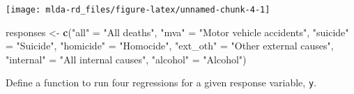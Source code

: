 \documentclass[]{book}
\newenvironment{Shaded}{\begin{snugshade}}{\end{snugshade}}
\newcommand{\KeywordTok}[1]{\textcolor[rgb]{0.13,0.29,0.53}{\textbf{#1}}}
\newcommand{\StringTok}[1]{\textcolor[rgb]{0.31,0.60,0.02}{#1}}
\newcommand{\NormalTok}[1]{#1}
\theoremstyle{definition}
\theoremstyle{definition}
\theoremstyle{definition}
\theoremstyle{remark}
\begin{document}
\begin{center}\texttt{[image: mlda-rd\_files/figure-latex/unnamed-chunk-4-1]} \end{center}

\begin{Shaded}
\begin{Highlighting}[]
\NormalTok{responses <-}\StringTok{ }\KeywordTok{c}\NormalTok{(}\StringTok{"all"}\NormalTok{ =}\StringTok{ "All deaths"}\NormalTok{,}
               \StringTok{"mva"}\NormalTok{ =}\StringTok{ "Motor vehicle accidents"}\NormalTok{,}
               \StringTok{"suicide"}\NormalTok{ =}\StringTok{ "Suicide"}\NormalTok{,}
               \StringTok{"homicide"}\NormalTok{ =}\StringTok{ "Homocide"}\NormalTok{,}
               \StringTok{"ext_oth"}\NormalTok{ =}\StringTok{ "Other external causes"}\NormalTok{,}
               \StringTok{"internal"}\NormalTok{ =}\StringTok{ "All internal causes"}\NormalTok{,}
               \StringTok{"alcohol"}\NormalTok{ =}\StringTok{ "Alcohol"}\NormalTok{)}
\end{Highlighting}
\end{Shaded}

Define a function to run four regressions for a given response variable,
\texttt{y}.
\end{document}
